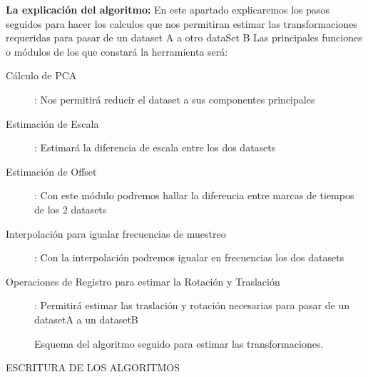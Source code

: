     
\textbf{La explicación del algoritmo:}
En este apartado explicaremos los pasos seguidos para hacer los calculos que nos permitiran estimar las transformaciones requeridas para pasar de un dataset A a otro dataSet B
Las principales funciones o módulos de los que constará la herramienta será:
\begin{description}
\item [Cálculo de PCA]: Nos permitirá reducir el dataset a  sus componentes principales
\item [Estimación de Escala]: Estimará la diferencia de escala entre los dos datasets
\item [Estimación de Offset]: Con este módulo podremos hallar la diferencia entre marcas de tiempos de los 2 datasets
\item [Interpolación para igualar frecuencias de muestreo]: Con la interpolación podremos igualar en frecuencias los dos datasets
\item [Operaciones de Registro para estimar la Rotación y Traslación]: Permitirá estimar las traslación y rotación necesarias para pasar de un datasetA a un datasetB
\end{description}


\begin{figure}[H]
\begin{center}
\hspace{0.5cm}

\end{center}

\caption{Esquema del algoritmo seguido para estimar las transformaciones.}
\end{figure}

ESCRITURA DE LOS ALGORITMOS


